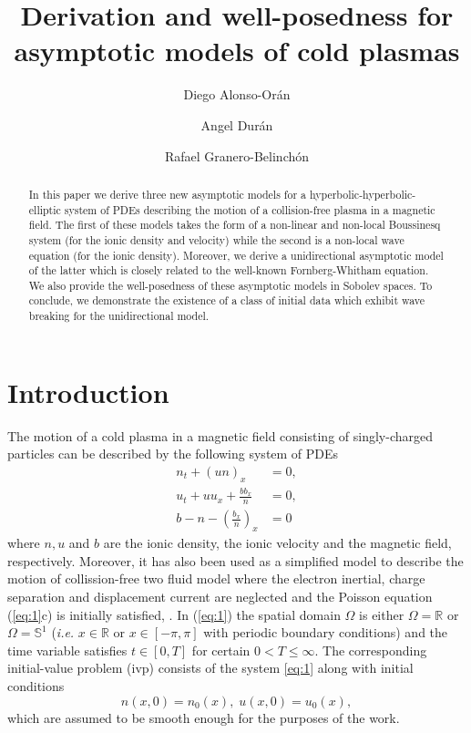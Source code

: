 \documentclass[final,11pt,a4paper,reqno]{amsart}
\title[Asymptotic models for cold plasma equation]{Derivation and well-posedness for asymptotic models of cold plasmas}
\author[D. Alonso-Or\'{a}n]{Diego Alonso-Or\'{a}n}
\author[A. Dur\'{a}n]{Angel Dur\'{a}n}
\author[R. Granero-Belinch\'{o}n]{Rafael Granero-Belinch\'{o}n}
\theoremstyle{definition}
\begin{document}
\begin{abstract}
In this paper we derive three new asymptotic models for a hyperbolic-hyperbolic-elliptic system of PDEs describing the motion of a collision-free plasma in a magnetic field.  The first of these models takes the form of a non-linear and non-local Boussinesq system (for the ionic density and velocity) while the second is a non-local wave equation (for the ionic density). Moreover, we derive a unidirectional asymptotic model of the latter which is closely related to the well-known Fornberg-Whitham equation. We also provide the well-posedness of these asymptotic models in Sobolev spaces. To conclude, we demonstrate the existence of a class of initial data which exhibit wave breaking for the unidirectional model. 
\end{abstract}





\maketitle
{\small
\tableofcontents}

\allowdisplaybreaks

\section{Introduction}
The motion of a cold plasma in a magnetic field consisting of singly-charged particles can be described by the following system of PDEs \cite{berezin1964theory, gardner1960similarity}
\begin{subequations}\label{eq:1}
\begin{align}
n_t+(un)_x&=0,\\
u_t+uu_x+\frac{bb_x}{n}&=0,\\
b-n-\left(\frac{b_x}{n}\right)_x&=0
\end{align}
\end{subequations}
where $n,u$ and $b$ are the ionic density, the ionic velocity and the magnetic field, respectively.  Moreover, it has also been used as a simplified model to describe the motion of collission-free two fluid model where the electron inertial, charge separation and displacement current are neglected and the Poisson equation (\ref{eq:1}c) is initially satisfied, \cite{berezin1964theory, kakutani1968reductive}. In (\ref{eq:1}) the spatial domain $\Omega$ is either $\Omega=\mathbb{R}$ or $\Omega=\mathbb{S}^1$ (\emph{i.e.} $x\in\mathbb{R}$ or $x\in [-\pi,\pi]$ with periodic boundary conditions) and the time variable satisfies $t\in [0,T]$ for certain $0<T\leq\infty$. The corresponding initial-value problem (ivp) consists of the system \eqref{eq:1} along with initial conditions
\begin{equation}\label{initialdata}
n(x,0)=n_0(x),\;u(x,0)=u_0(x),
\end{equation}
which are assumed to be smooth enough for the purposes of the work.
\end{document}
